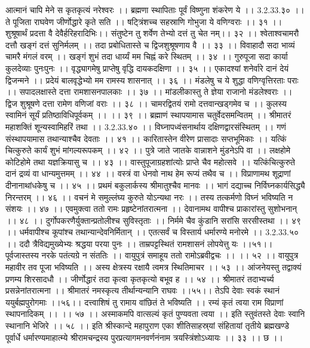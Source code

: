 आत्मानं चापि मेने स कृतकृत्यं नरेश्वरः ।।
ब्रह्मणा स्थापिताः पूर्वं विष्णुना शंकरेण ये ।। 3.2.33.३० ।।
ते पूजिता राघवेण जीर्णोद्धारे कृते सति ।।
षट्त्रिंशच्च सहस्राणि गोभुजा ये वणिग्वराः ।। ३१ ।।
शुश्रूषार्थं प्रदत्ता वै देवैर्हरिहरादिभिः।।
संतुष्टेन तु शर्वेण तेभ्यो दत्तं तु चेत नम्।। ३२ ।।
श्वेताश्वचामरौ दत्तौ खङ्गं दत्तं सुनिर्मलम् ।।
तदा प्रबोधितास्ते च द्विजशुश्रूषणाय वै ।। ३३ ।।
विवाहादौ सदा भाव्यं चामरै मंगलं वरम् ।।
खङ्गं शुभं तदा धार्य्यं मम चिह्नं करे स्थितम् ।। ३४ ।।
गुरुपूजा सदा कार्या कुलदेव्याः पुनःपुनः ।।
वृद्ध्यागमेषु प्राप्तेषु वृद्धि दायकदक्षिणा ।। ३५ ।।
एकादश्यां शनेर्वारे दानं देयं द्विजन्मने ।।
प्रदेयं बालवृद्धेभ्यो मम रामस्य शासनात् ।। ३६ ।।
मंडलेषु च ये शुद्धा वणिग्वृत्तिरताः पराः ।।
सपादलक्षास्ते दत्ता रामशासनपालकाः ।। ३७ ।।
मांडलीकास्तु ते ज्ञेया राजानो मंडलेश्वराः ।।
द्विज शुश्रूषणे दत्ता रामेण वणिजां वराः ।। ३८ ।।
चामरद्वितयं रामो दत्तवान्खड्गमेव च ।।
कुलस्य स्वामिनं सूर्यं प्रतिष्ठाविधिपूर्वकम् ।। ।। ३९ ।।
ब्रह्माणं स्थापयामास चतुर्वेदसमन्वितम् ।।
श्रीमातरं महाशक्तिं शून्यस्वामिहरिं तथा ।। 3.2.33.४० ।।
विघ्नापध्वंसनार्थाय दक्षिणद्वारसंस्थितम् ।।
गणं संस्थापयामास तथान्याश्चैव देवताः ।। ४१ ।।
कारितास्तेन वीरेण प्रासादाः सप्तभूमिकाः ।।
यत्किं चित्कुरुते कार्यं शुभं मांगल्यरूपकम् ।। ४२ ।।
पुत्रे जाते जातके वान्नाशने मुंडनेऽपि वा ।।
लक्षहोमे कोटिहोमे तथा यज्ञक्रियासु च ।। ४३ ।।
वास्तुपूजाग्रहशांत्योः प्राप्ते चैव महोत्सवे ।।
यत्किंचित्कुरुते दानं द्रव्यं वा धान्यमुत्तमम् ।। ४४ ।।
वस्त्रं वा धेनवो नाथ हेम रूप्यं तथैव च ।।
विप्राणामथ शूद्राणां दीनानाथांधकेषु च ।। ४५ ।।
प्रथमं बकुलार्कस्य श्रीमातुश्चैव मानवः ।।
भागं दद्याच्च निर्विघ्नकार्यसिद्ध्यै निरन्तरम् ।। ४६ ।।
वचनं मे समुल्लंघ्य कुरुते योऽन्यथा नरः ।।
तस्य तत्कर्मणो विघ्नं भविष्यति न संशयः ।। ४७ ।।
एवमुक्त्वा ततो रामः प्रहृष्टेनांतरात्मना ।।
देवानामथ वापीश्च प्राकारांस्तु सुशोभनान् ।। ४८ ।।
दुर्गोपकरणैर्युक्तान्प्रतोलीश्च सुविस्तृताः ।।
निर्ममे चैव कुंडानि सरांसि सरसीस्तथा ।। ४९ ।।
धर्मवापीश्च कूपांश्च तथान्यान्देवनिर्मितान् ।।
एतत्सर्वं च विस्तार्य धर्मारण्ये मनोरमे ।। 3.2.33.५० ।।
ददौ त्रैविद्यमुख्येभ्यः श्रद्धया परया पुनः ।।
ताम्रपट्टस्थितं रामशासनं लोपयेत्तु यः ।।५१।।
पूर्वजास्तस्य नरके पतंत्यग्रे न संततिः ।।
वायुपुत्रं समाहूय ततो रामोऽब्रवीद्वचः ।। ।। ५२ ।।
वायुपुत्र महावीर तव पूजा भविष्यति ।।
अस्य क्षेत्रस्य रक्षायै त्वमत्र स्थितिमाचर ।। ५३ ।।
आंजनेयस्तु तद्वाक्यं प्रणम्य शिरसादधौ ।।
जीर्णोद्धारं तदा कृत्वा कृतकृत्यो बभूव ह ।। ५४ ।।
श्रीमातरं तदाभ्यर्च्य प्रसन्नेनांतरात्मना ।।
श्रीमातरं नमस्कृत्य तीर्थान्यन्यानि राघवः ।।५५।।
तेऽपि देवाः स्वकं स्थानं ययुर्बह्मपुरोगमाः ।।५६।।
दत्त्वाशिषं तु रामाय वांछितं ते भविष्यति ।।
रम्यं कृतं त्वया राम विप्राणां स्थापनादिकम् ।। ।। ५७ ।।
अस्माकमपि वात्सल्यं कृतं पुण्यवता त्वया ।।
इति स्तुवंतस्ते देवाः स्वानि स्थानानि भेजिरे ।। ५८ ।।
इति श्रीस्कान्दे महापुराण एका शीतिसाहस्र्यां संहितायां तृतीये ब्रह्मखण्डे पूर्वार्धे धर्मारण्यमाहात्म्ये श्रीरामचन्द्रस्य पुरप्रत्यागमनवर्णनंनाम त्रयस्त्रिंशोऽध्यायः ।। ३३ ।। छ ।।


